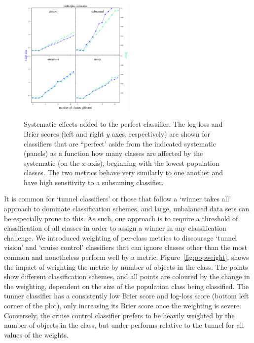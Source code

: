 \begin{figure}
	\begin{center}
		\label{fig:cruise}
		\includegraphics[width=0.5\textwidth]{./fig/systematics_onlyperfect.png}
		\caption{Systematic effects added to the perfect classifier.
		The log-loss and Brier scores (left and right $y$ axes, respectively) are shown for classifiers that are ``perfect' aside from the indicated systematic (panels) as a function how many classes are affected by the systematic (on the $x$-axis), beginning with the lowest population classes.
		The two metrics behave very similarly to one another and have high sensitivity to a subsuming classifier.}
	\end{center}
\end{figure}

It is common for `tunnel classifiers' or those that follow a `winner takes all' approach to dominate classification schemes, and large, unbalanced data sets can be especially prone to this.
As such, one approach is to require a threshold of classification of all classes in order to assign a winner in any classification challenge.
We introduced weighting of per-class metrics to discourage `tunnel vision' and `cruise control' classifiers that can ignore classes other than the most common and nonetheless perform well by a metric.
Figure~\ref{fig:popweight}, shows the impact of weighting the metric by number of objects in the class.
The points show different classification schemes, and all points are coloured by the change in the weighting, dependent on the size of the population class being classified.
The tunner classifier has a consistently low Brier score and log-loss score (bottom left corner of the plot), only increasing its Brier score once the weighting is severe.
Conversely, the cruise control classifier prefers to be heavily weighted by the number of objects in the class, but under-performs relative to the tunnel for all values of the weights.

